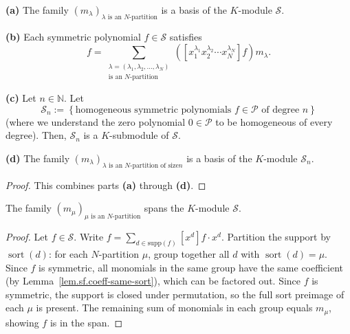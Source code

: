 \begin{theorem}
\label{thm.sf.m-basis}
\leantarget
\leanok
\textbf{(a)} The family $\left(  m_{\lambda}\right)
_{\lambda\text{ is an }N\text{-partition}}$ is a basis of the $K$-module
$\mathcal{S}$.

\textbf{(b)} Each symmetric polynomial $f\in\mathcal{S}$ satisfies%
\[
f=\sum_{\substack{\lambda=\left(  \lambda_{1},\lambda_{2},\ldots,\lambda
_{N}\right)  \\\text{is an }N\text{-partition}}}\left(  \left[  x_{1}%
^{\lambda_{1}}x_{2}^{\lambda_{2}}\cdots x_{N}^{\lambda_{N}}\right]  f\right)
m_{\lambda}.
\]

\textbf{(c)} Let $n\in\mathbb{N}$. Let%
\[
\mathcal{S}_{n}:=\left\{  \text{homogeneous symmetric polynomials }%
f\in\mathcal{P}\text{ of degree }n\right\}
\]
(where we understand the zero polynomial $0\in\mathcal{P}$ to be homogeneous
of every degree). Then, $\mathcal{S}_{n}$ is a $K$-submodule of $\mathcal{S}$.

\textbf{(d)} The family
$\left(  m_{\lambda}\right)  _{\lambda\text{ is an }N\text{-partition of size
}n}$ is a basis of the $K$-module $\mathcal{S}_{n}$.
\end{theorem}

\begin{proof}
This combines parts \textbf{(a)} through \textbf{(d)}.
\end{proof}

\begin{theorem}
\label{thm.sf.m-basis.a.span}
\leanhelper
\leanok
The family $(m_\mu)_{\mu \text{ is an } N\text{-partition}}$ spans the $K$-module
$\mathcal{S}$.
\end{theorem}

\begin{proof}
\leanok
Let $f \in \mathcal{S}$. Write $f = \sum_{d \in \mathrm{supp}(f)} [x^d] f \cdot x^d$.
Partition the support by $\operatorname{sort}(d)$: for each $N$-partition $\mu$,
group together all $d$ with $\operatorname{sort}(d) = \mu$.
Since $f$ is symmetric, all monomials in the same group have the same coefficient
(by Lemma~\ref{lem.sf.coeff-same-sort}), which can be factored out.
Since $f$ is symmetric, the support is closed under permutation, so the full
sort preimage of each $\mu$ is present. The remaining sum of monomials
in each group equals $m_\mu$, showing $f$ is in the span.
\end{proof}

